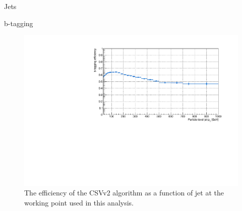 \begin{section}{Jets}
\begin{subsection}{b-tagging}
\begin{figure}[tbp!]
\centering
\includegraphics[angle=0,width=0.80\columnwidth]{fig/btag_eff.pdf}
\caption{The efficiency of the CSVv2 algorithm as a function of jet \pT at the working point used in this analysis.}
\label{fig:btag_eff}
\end{figure}


\end{subsection}

\end{section}

